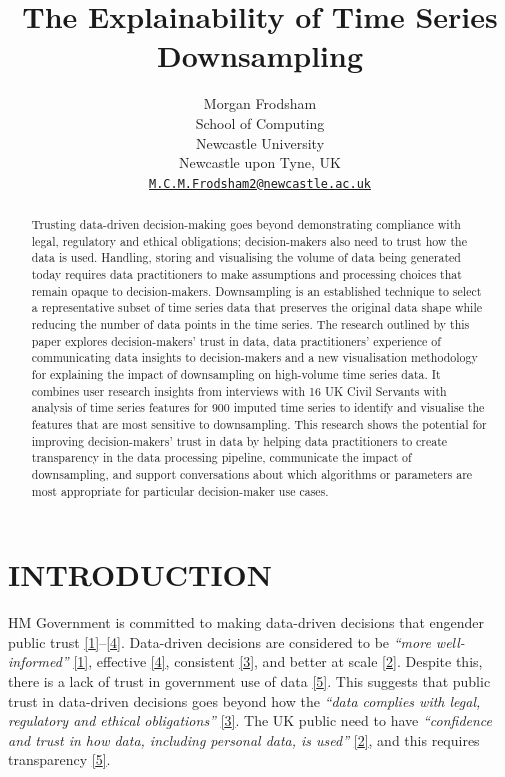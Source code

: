 \documentclass{article}
\title{The Explainability of Time Series Downsampling}
\author{
    Morgan Frodsham
   \\
    School of Computing \\
    Newcastle University \\
  Newcastle upon Tyne, UK \\
  \texttt{\href{mailto:M.C.M.Frodsham2@newcastle.ac.uk}{\nolinkurl{M.C.M.Frodsham2@newcastle.ac.uk}}} \\
  }
\begin{document}
\maketitle


\begin{abstract}
Trusting data-driven decision-making goes beyond demonstrating
compliance with legal, regulatory and ethical obligations;
decision-makers also need to trust how the data is used. Handling,
storing and visualising the volume of data being generated today
requires data practitioners to make assumptions and processing choices
that remain opaque to decision-makers. Downsampling is an established
technique to select a representative subset of time series data that
preserves the original data shape while reducing the number of data
points in the time series. The research outlined by this paper explores
decision-makers' trust in data, data practitioners' experience of
communicating data insights to decision-makers and a new visualisation
methodology for explaining the impact of downsampling on high-volume
time series data. It combines user research insights from interviews
with 16 UK Civil Servants with analysis of time series features for 900
imputed time series to identify and visualise the features that are most
sensitive to downsampling. This research shows the potential for
improving decision-makers' trust in data by helping data practitioners
to create transparency in the data processing pipeline, communicate the
impact of downsampling, and support conversations about which algorithms
or parameters are most appropriate for particular decision-maker use
cases.
\end{abstract}


\hypertarget{introduction}{%
\section{INTRODUCTION}\label{introduction}}

HM Government is committed to making data-driven decisions that engender
public trust
\protect\hyperlink{ref-data2017}{{[}1{]}}--\protect\hyperlink{ref-data2022}{{[}4{]}}.
Data-driven decisions are considered to be \emph{``more well-informed''}
\protect\hyperlink{ref-data2017}{{[}1{]}}, effective
\protect\hyperlink{ref-data2022}{{[}4{]}}, consistent
\protect\hyperlink{ref-data2021}{{[}3{]}}, and better at scale
\protect\hyperlink{ref-data2020}{{[}2{]}}. Despite this, there is a lack
of trust in government use of data
\protect\hyperlink{ref-trust}{{[}5{]}}. This suggests that public trust
in data-driven decisions goes beyond how the \emph{``data complies with
legal, regulatory and ethical obligations''}
\protect\hyperlink{ref-data2021}{{[}3{]}}. The UK public need to have
\emph{``confidence and trust in how data, including personal data, is
used''} \protect\hyperlink{ref-data2020}{{[}2{]}}, and this requires
transparency \protect\hyperlink{ref-trust}{{[}5{]}}.
\end{document}
